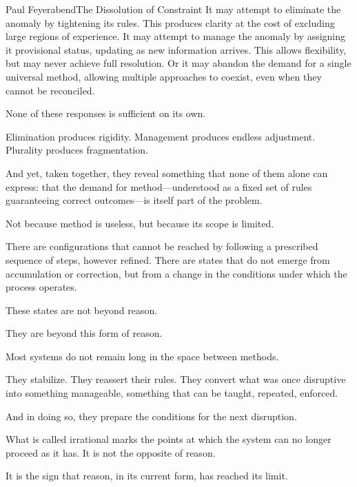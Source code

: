 \begin{formalecho}{Paul Feyerabend}{The Dissolution of Constraint}
It may attempt to eliminate the anomaly by tightening its rules.
This produces clarity at the cost of excluding large regions of
experience. It may attempt to manage the anomaly by assigning it
provisional status, updating as new information arrives. This
allows flexibility, but may never achieve full resolution. Or it
may abandon the demand for a single universal method, allowing
multiple approaches to coexist, even when they cannot be reconciled.

None of these responses is sufficient on its own.

Elimination produces rigidity. Management produces endless
adjustment. Plurality produces fragmentation.

And yet, taken together, they reveal something that none of them
alone can express: that the demand for method---understood as a
fixed set of rules guaranteeing correct outcomes---is itself part
of the problem.

Not because method is useless, but because its scope is limited.

There are configurations that cannot be reached by following a
prescribed sequence of steps, however refined. There are states
that do not emerge from accumulation or correction, but from a
change in the conditions under which the process operates.

These states are not beyond reason.

They are beyond this form of reason.

\medskip

Most systems do not remain long in the space between methods.

They stabilize. They reassert their rules. They convert what was
once disruptive into something manageable, something that can be
taught, repeated, enforced.

And in doing so, they prepare the conditions for the next
disruption.

What is called irrational marks the points at which the system can
no longer proceed as it has. It is not the opposite of reason.

It is the sign that reason, in its current form, has reached its
limit.

\end{formalecho}
